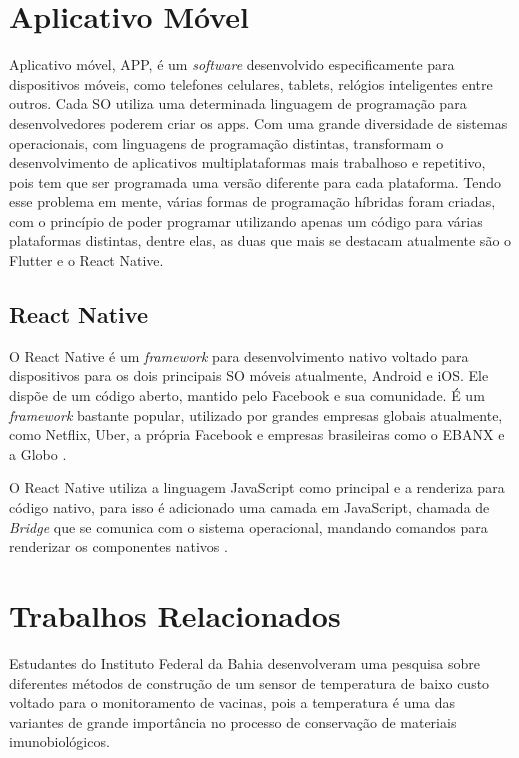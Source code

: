 \section{Aplicativo Móvel}
\label{fund:app}
Aplicativo móvel, APP, é um \textit{software} desenvolvido especificamente para dispositivos móveis, como telefones celulares, tablets, relógios inteligentes entre outros. Cada SO utiliza uma determinada linguagem de programação para desenvolvedores poderem criar os apps. Com uma grande diversidade de sistemas operacionais, com linguagens de programação distintas, transformam o desenvolvimento de aplicativos multiplataformas mais trabalhoso e repetitivo, pois tem que ser programada uma versão diferente para cada plataforma. Tendo esse problema em mente, várias formas de programação híbridas foram criadas, com o princípio de poder programar utilizando apenas um código para várias plataformas distintas, dentre elas, as duas que mais se destacam atualmente são o Flutter e o React Native.

\subsection{React Native}
\label{fund:react-native}
O React Native é um \textit{framework} para desenvolvimento nativo voltado para dispositivos para os dois principais SO móveis atualmente, Android e iOS. Ele dispõe de um código aberto, mantido pelo Facebook e sua comunidade. É um \textit{framework} bastante popular, utilizado por grandes empresas globais atualmente, como Netflix, Uber, a própria Facebook e empresas brasileiras como o EBANX e a Globo \cite{empresasbrreact}.

O React Native utiliza a linguagem JavaScript como principal e a renderiza para código nativo, para isso é adicionado uma camada em JavaScript, chamada de \textit{Bridge} que se comunica com o sistema operacional, mandando comandos para renderizar os componentes nativos \cite{docreactnative}.

\section{Trabalhos Relacionados}
\label{fund:trabalhos-relacionados}
Estudantes do Instituto Federal da Bahia desenvolveram uma pesquisa \cite{cruzdesenvolvimento} sobre diferentes métodos de construção de um sensor de temperatura de baixo custo voltado para o monitoramento de vacinas, pois a temperatura é uma das variantes de grande importância no  processo de conservação de materiais imunobiológicos.


